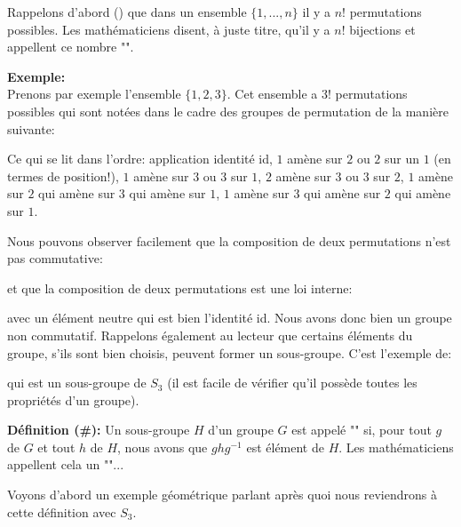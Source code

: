 	Rappelons d'abord () que dans un ensemble $\{1,...,n\}$ il y a $n!$ permutations possibles. Les mathématiciens disent, à juste titre, qu'il y a $n!$ bijections et appellent ce nombre "".
	
	\begin{tcolorbox}[colframe=black,colback=white,sharp corners]
	\textbf{{\Large {}}Exemple:}\\
	Prenons par exemple l'ensemble $\{1,2,3\}$. Cet ensemble a $3!$ permutations possibles qui sont notées dans le cadre des groupes de permutation de la manière suivante:
	
	Ce qui se lit dans l'ordre: application identité id, $1$ amène sur $2$ ou $2$ sur un $1$ (en termes de position!), $1$ amène sur $3$ ou $3$ sur $1$, $2$ amène sur $3$ ou $3$ sur $2$, $1$ amène sur $2$ qui amène sur $3$ qui amène sur $1$, $1$ amène sur $3$ qui amène sur $2$ qui amène sur $1$.
	
	Nous pouvons observer facilement que la composition de deux permutations n'est pas commutative:
	
	et que la composition de deux permutations est une loi interne:
	
	avec un élément neutre qui est bien l'identité id. Nous avons donc bien un groupe non commutatif. Rappelons également au lecteur que certains éléments du groupe, s'ils sont bien choisis, peuvent former un sous-groupe. C'est l'exemple de:
	
	qui est un sous-groupe de $S_3$ (il est facile de vérifier qu'il possède toutes les propriétés d'un groupe).
	\end{tcolorbox}
	
	\textbf{Définition (\#\mydef):} Un sous-groupe $H$ d'un groupe $G$ est appelé "" si, pour tout $g$ de $G$ et tout $h$ de $H$, nous avons que $ghg^{-1}$ est élément de $H$. Les mathématiciens appellent cela un ""...
	
	Voyons d'abord un exemple géométrique parlant après quoi nous reviendrons à cette définition avec $S_3$.

